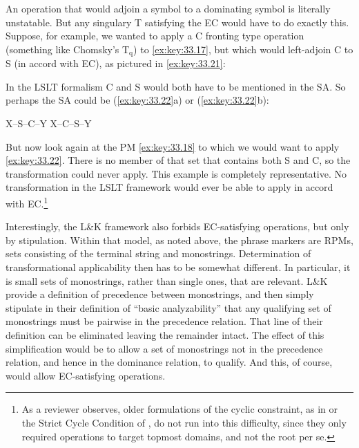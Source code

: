 \documentclass[output=paper]{langsci/langscibook}
\begin{document}
\ea\label{ex:key:33.20}
\z

An operation that would adjoin a symbol to a dominating symbol is literally
unstatable. But any singulary  T satisfying the \glsdesc{EC} would have
to do exactly this. Suppose, for example, we wanted to apply a C fronting type
operation (something like Chomsky's T$_\text{q}$) to \eqref{ex:key:33.17}, but
which would left-adjoin C to S (in accord with \gls{EC}), as pictured in
\eqref{ex:key:33.21}:

\ea\label{ex:key:33.21}
\z

In the LSLT\nocite{Chomsky1955} formalism C and S would both have to be
mentioned in the \gls{SA}. So perhaps the \gls{SA} could be
(\ref{ex:key:33.22}a) or (\ref{ex:key:33.22}b):

\ea\label{ex:key:33.22}
    \ea X--S--C--Y
    \ex X--C--S--Y
    \z
\z

But now look again at the \gls{PM} \eqref{ex:key:33.18} to
which we would want to apply \eqref{ex:key:33.22}.  There is no member of that
set that contains both S and C, so the transformation could never apply. This
example is completely representative. No  transformation in the
LSLT\nocite{Chomsky1955} framework would ever be able to apply in accord with
\gls{EC}.\footnote{As a reviewer observes, older formulations of the cyclic
    constraint, as in \cite{Chomsky1965} or the Strict Cycle Condition of
\cite{Chomsky1973}, do not run into this difficulty, since they only required
operations to target topmost domains, and not the root per se.}

Interestingly, the L\&K framework also forbids EC-satisfying operations, but
only by stipulation. Within that model, as noted above, the phrase markers are
R\glspl{PM}, sets consisting of the terminal string and monostrings.
Determination of transformational applicability then has to be somewhat
different. In particular, it is small sets of monostrings, rather than single
ones, that are relevant. L\&K provide a definition of precedence between
monostrings, and then simply stipulate in their definition of ``basic
analyzability'' that any qualifying set of monostrings must be pairwise in the
precedence relation. That line of their definition can be eliminated leaving
the remainder intact. The effect of this simplification would be to allow a set
of monostrings not in the precedence relation, and hence in the dominance
relation, to qualify. And this, of course, would allow EC-satisfying
operations.
\end{document}
